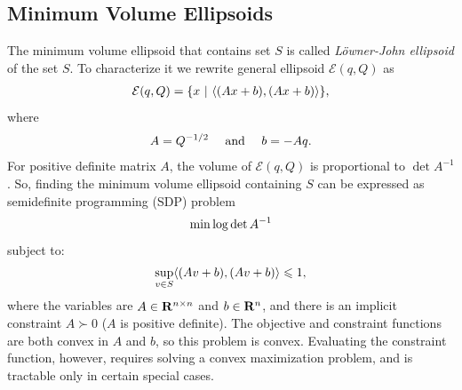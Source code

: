 \documentclass[letterpaper,10pt,english]{sphinxmanual}
\begin{document}
\subsection{Minimum Volume Ellipsoids}
\label{chap_ellcalc:minimum-volume-ellipsoids}
The minimum volume ellipsoid that contains set \(S\) is called
\emph{Löwner-John ellipsoid} of the set \(S\). To characterize it we
rewrite general ellipsoid \({\mathcal E}(q,Q)\) as
\begin{gather}
\begin{split}{\mathcal E}(q,Q) = \{x ~|~ \langle (Ax + b), (Ax + b)\rangle \},\end{split}\notag
\end{gather}
where
\begin{gather}
\begin{split}A = Q^{-1/2} ~~~ \mbox{ and } ~~~ b = -Aq .\end{split}\notag
\end{gather}
For positive definite matrix \(A\), the volume of
\({\mathcal E}(q,Q)\) is proportional to \(\det A^{-1}\). So,
finding the minimum volume ellipsoid containing \(S\) can be
expressed as semidefinite programming (SDP) problem
\begin{gather}
\begin{split}\min \log \det A^{-1}\end{split}\notag
\end{gather}
subject to:
\begin{gather}
\begin{split}\sup_{v\in S} \langle (Av + b), (Av + b)\rangle \leqslant1,\end{split}\notag
\end{gather}
where the variables are \(A\in{\bf R}^{n\times n}\) and
\(b\in{\bf R}^n\), and there is an implicit constraint
\(A\succ 0\) (\(A\) is positive definite). The objective and
constraint functions are both convex in \(A\) and \(b\), so this
problem is convex. Evaluating the constraint function, however, requires
solving a convex maximization problem, and is tractable only in certain
special cases.
\end{document}
